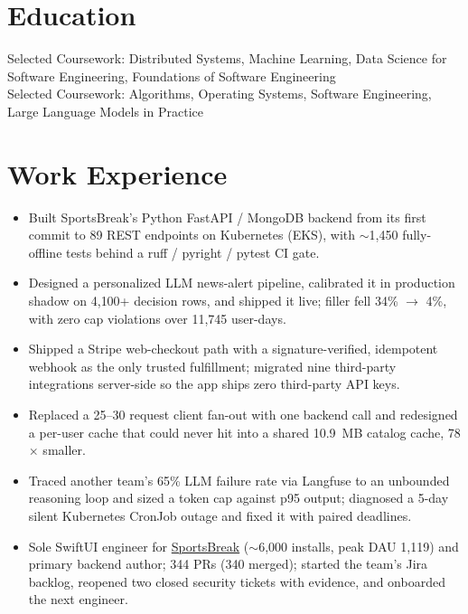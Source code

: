 \documentclass[11pt, letterpaper]{article}
\begin{document}

\section{Education}
Selected Coursework: Distributed Systems, Machine Learning, Data Science for Software Engineering, Foundations of Software Engineering\\[1pt]
Selected Coursework: Algorithms, Operating Systems, Software Engineering, Large Language Models in Practice

\section{Work Experience}
\begin{itemize}
  \item Built SportsBreak's Python FastAPI / MongoDB backend from its first commit to 89 REST endpoints on Kubernetes (EKS), with $\sim$1{,}450 fully-offline tests behind a ruff / pyright / pytest CI gate.
  \item Designed a personalized LLM news-alert pipeline, calibrated it in production shadow on 4{,}100+ decision rows, and shipped it live; filler fell 34\% $\to$ 4\%, with zero cap violations over 11{,}745 user-days.
  \item Shipped a Stripe web-checkout path with a signature-verified, idempotent webhook as the only trusted fulfillment; migrated nine third-party integrations server-side so the app ships zero third-party API keys.
  \item Replaced a 25--30 request client fan-out with one backend call and redesigned a per-user cache that could never hit into a shared 10.9~MB catalog cache, 78$\times$ smaller.
  \item Traced another team's 65\% LLM failure rate via Langfuse to an unbounded reasoning loop and sized a token cap against p95 output; diagnosed a 5-day silent Kubernetes CronJob outage and fixed it with paired deadlines.
  \item Sole SwiftUI engineer for \href{https://apps.apple.com/app/id6762649287}{SportsBreak} ($\sim$6{,}000 installs, peak DAU 1{,}119) and primary backend author; 344 PRs (340 merged); started the team's Jira backlog, reopened two closed security tickets with evidence, and onboarded the next engineer.
\end{itemize}
\end{document}
